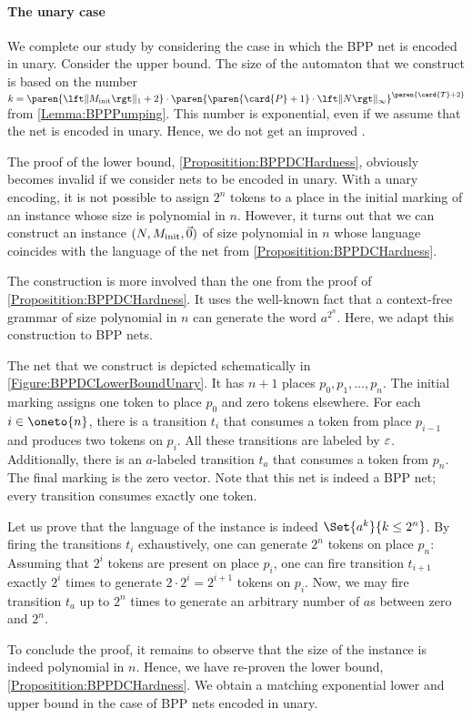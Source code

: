 \documentclass[../../diss.tex]{subfiles}
\begin{document}
\paragraph{The unary case}

We complete our study by considering the case in which the BPP net is encoded in unary.
Consider the upper bound.
The size of the automaton that we construct is based on the number $k = \paren{\normone{\Minit}+2} \cdot \paren{ \paren{\card{P}+1} \cdot \norminf{N}}^{ \paren{\card{T} + 2} }$ from \cref{Lemma:BPPPumping}.
This number is exponential, even if we assume that the net is encoded in unary.
Hence, we do not get an improved .

The proof of the lower bound, \cref{Propositition:BPPDCHardness}, obviously becomes invalid if we consider nets to be encoded in unary.
With a unary encoding, it is not possible to assign $2^n$ tokens to a place in the initial marking of an instance whose size is polynomial in $n$.
However, it turns out that we can construct an instance $(N,M_{\text{init}},\vec{0})$ of size polynomial in $n$ whose language coincides with the language of the net from \cref{Propositition:BPPDCHardness}.

The construction is more involved than the one from the proof of \cref{Propositition:BPPDCHardness}.
It uses the well-known fact that a context-free grammar of size polynomial in $n$ can generate the word $a^{2^n}$.
Here, we adapt this construction to BPP nets.

The net that we construct is depicted schematically in \cref{Figure:BPPDCLowerBoundUnary}.
It has $n+1$ places $p_0, p_1, \ldots, p_n$.
The initial marking assigns one token to place $p_0$ and zero tokens elsewhere.
For each $i \in \oneto{n}$, there is a transition $t_i$ that consumes a token from place $p_{i-1}$ and produces two tokens on $p_i$.
All these transitions are labeled by $\varepsilon$.
Additionally, there is an $a$-labeled transition $t_a$ that consumes a token from $p_n$.
The final marking is the zero vector.
Note that this net is indeed a BPP net; every transition consumes exactly one token.

Let us prove that the language of the instance is indeed $\Set{ a^k }{ k \leq 2^n}$.
By firing the transitions $t_i$ exhaustively, one can generate $2^n$ tokens on place $p_{n}$: Assuming that $2^{i}$ tokens are present on place $p_i$, one can fire transition $t_{i+1}$ exactly $2^{i}$ times to generate $2 \cdot 2^{i} = 2^{i+1}$ tokens on $p_i$.
Now, we may fire transition $t_a$ up to $2^n$ times to generate an arbitrary number of $a$s between zero and $2^n$.

To conclude the proof, it remains to observe that the size of the instance is indeed polynomial in $n$.
Hence, we have re-proven the lower bound, \cref{Propositition:BPPDCHardness}.
We obtain a matching exponential lower and upper bound in the case of BPP nets encoded in unary.
\end{document}
